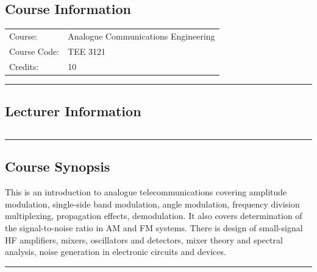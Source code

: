 
\subsection*{Course Information}\label{course:tee3121}
\vspace{0ex}%
\noindent\parbox{0.5\textwidth}{%
    \noindent\begin{tabular}{@{}ll}
                 \textsf{Course:}          & 	Analogue Communications Engineering  \\
                 \textsf{Course Code:}         & 	TEE 3121    \\
                 \textsf{Credits:}    & 	10
    \end{tabular}}
\vspace{2ex}\hrule\vspace{2ex}




\subsection*{Lecturer Information}
\noindent\parbox{0.5\textwidth}{%
    \noindent\begin{tabular}{@{}ll}
                 
    \end{tabular}}
\vspace{2ex}\hrule\vspace{2ex}

\subsection*{Course Synopsis}
This is an introduction to analogue telecommunications covering amplitude modulation, single-side band modulation, angle modulation, frequency division multiplexing, propagation effects, demodulation.
It also covers determination of the signal-to-noise ratio in AM and FM systems.
There is design of small-signal HF amplifiers, mixers, oscillators and detectors, mixer theory and spectral analysis, noise generation in electronic circuits and devices.
\vspace{2ex}\hrule\vspace{2ex}

